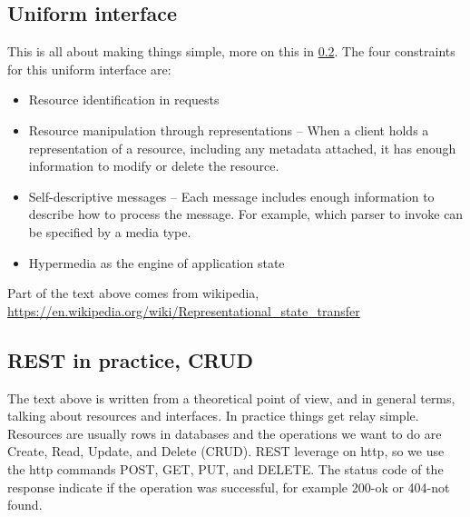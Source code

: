 \subsection{Uniform interface}
This is all about making things simple, more on this in \ref{section:crud}. The four constraints for this uniform interface are:
\begin{itemize}
  \item Resource identification in requests
  \item Resource manipulation through representations -- When a client holds a representation of a resource, including any metadata attached, it has enough information to modify or delete the resource.
  \item Self-descriptive messages -- Each message includes enough information to describe how to process the message. For example, which parser to invoke can be specified by a media type.
  \item Hypermedia as the engine of application state
 \end{itemize}
 
 Part of the text above comes from wikipedia,\\ \url{https://en.wikipedia.org/wiki/Representational_state_transfer}

\subsection{REST in practice, CRUD} \label{section:crud}
The text above is written from a theoretical point of view, and in general terms, talking about resources and interfaces. In practice things get relay simple. Resources are usually rows in databases and the operations we want to do are Create, Read, Update, and Delete (CRUD). REST leverage on http, so we use the http commands POST, GET, PUT, and DELETE. The status code of the response indicate if the operation was successful, for example 200-ok or 404-not found.

